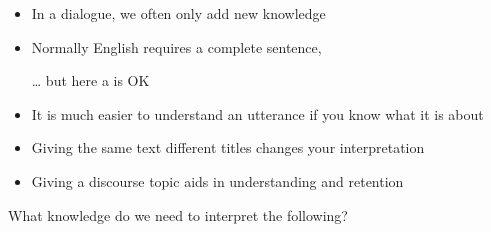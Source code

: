 \documentclass[headrule,footrule]{foils}
\begin{document}
\begin{itemize}
\item In a dialogue, we often only add new knowledge
  \begin{exe}
    \ex 
    \begin{xlist}
      \ex {}
      \ex {}
  \end{xlist}
    \ex 
    \begin{xlist}
      \ex {}
      \ex {}
  \end{xlist}
  \end{exe}
\item Normally English requires a complete sentence, 
\item[\ldots] but here a  is OK
\end{itemize}

\begin{itemize}
\item It is much easier to understand an utterance if you know what
  it is about \citep{Bransford:Johnson:1972}

\item Giving the same text different titles changes your interpretation

\item Giving a discourse topic aids in understanding and retention

\end{itemize}


What knowledge do we need to interpret the following?

\begin{exe}
  \ex 
  \begin{xlist}
    \ex {}
    \ex {}
  \end{xlist}
  \ex 
  \begin{xlist}
    \ex {}
    \ex {}
  \end{xlist}
  \ex 
  \begin{xlist}
    \ex {}
    \ex {}
  \end{xlist}
 \ex 
  \begin{xlist}
    \ex {}
    \ex {}
    \ex {}
    \ex {}
    \ex {}

  \end{xlist}

\end{exe}
\end{document}
